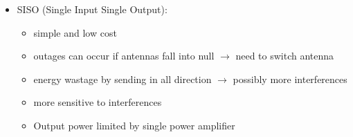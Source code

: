 \begin{itemize}
\begin{itemize}
    \end{itemize}
    \item SISO (Single Input Single Output):
    \begin{itemize}
        \item simple and low cost
        \item outages can occur if antennas fall into null $\rightarrow$ need to switch antenna
        \item energy wastage by sending in all direction $\rightarrow$ possibly more interferences
        \item more sensitive to interferences
        \item Output power limited by single power amplifier
    \end{itemize}
\end{itemize}